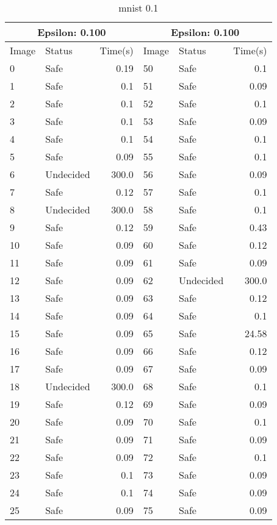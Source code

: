 \begin{table}[!ht]
  \centering
  \caption{mnist 0.1}
  \footnotesize
  \begin{tabular}{|llr|llr|}
    \toprule
    \multicolumn{3}{|c|}{Epsilon: 0.100} & \multicolumn{3}{|c|}{Epsilon: 0.100} \\
    \midrule
    Image & Status & Time(s) &Image & Status & Time(s)\\ 
    \midrule
    0 & Safe & 0.19 &    50 & Safe & 0.1\\ 
    1 & Safe & 0.1 &    51 & Safe & 0.09\\ 
    2 & Safe & 0.1 &    52 & Safe & 0.1\\ 
    3 & Safe & 0.1 &    53 & Safe & 0.09\\ 
    4 & Safe & 0.1 &    54 & Safe & 0.1\\ 
    5 & Safe & 0.09 &    55 & Safe & 0.1\\ 
    6 & Undecided & 300.0 &    56 & Safe & 0.09\\ 
    7 & Safe & 0.12 &    57 & Safe & 0.1\\ 
    8 & Undecided & 300.0 &    58 & Safe & 0.1\\ 
    9 & Safe & 0.12 &    59 & Safe & 0.43\\ 
    10 & Safe & 0.09 &    60 & Safe & 0.12\\ 
    11 & Safe & 0.09 &    61 & Safe & 0.09\\ 
    12 & Safe & 0.09 &    62 & Undecided & 300.0\\ 
    13 & Safe & 0.09 &    63 & Safe & 0.12\\ 
    14 & Safe & 0.09 &    64 & Safe & 0.1\\ 
    15 & Safe & 0.09 &    65 & Safe & 24.58\\ 
    16 & Safe & 0.09 &    66 & Safe & 0.12\\ 
    17 & Safe & 0.09 &    67 & Safe & 0.09\\ 
    18 & Undecided & 300.0 &    68 & Safe & 0.1\\ 
    19 & Safe & 0.12 &    69 & Safe & 0.09\\ 
    20 & Safe & 0.09 &    70 & Safe & 0.1\\ 
    21 & Safe & 0.09 &    71 & Safe & 0.09\\ 
    22 & Safe & 0.09 &    72 & Safe & 0.1\\ 
    23 & Safe & 0.1 &    73 & Safe & 0.09\\ 
    24 & Safe & 0.1 &    74 & Safe & 0.09\\ 
    25 & Safe & 0.09 &    75 & Safe & 0.09\\ 

\end{tabular}
\end{table}

